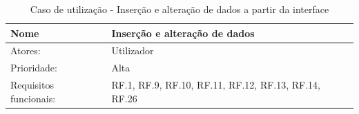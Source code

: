 \documentclass[11pt, twoside]{report}
\begin{document}
	
	\begin{table}[H]
		\caption{Caso de utilização - Inserção e alteração de dados a partir da interface}
		\begin{center}	
			\begin{tabularx}{\textwidth}{|l|X|}
				\hline
				\textbf{Nome }              & \textbf{Inserção e alteração de dados}                                                                                                                                                                                                                                                                                                                                                                                                                                                                                                                              \\
				\hline
				Atores:                     & Utilizador                                                                                                                                                                                                                                                                                                                                                                                                                                                                                                                                                              \\
				\hline
				Prioridade:                 & Alta                                                                                                                                                                                                                                                                                                                                                                                                                                                                                                                                                                    \\
				\hline
				Requisitos funcionais:      & RF.1, RF.9, RF.10, RF.11, RF.12, RF.13, RF.14, RF.26                                                                                                                                                                                                                                                                                                                                                                                                                                                                                                                    \\

\end{tabularx}
\end{center}
\end{table}
\end{document}
